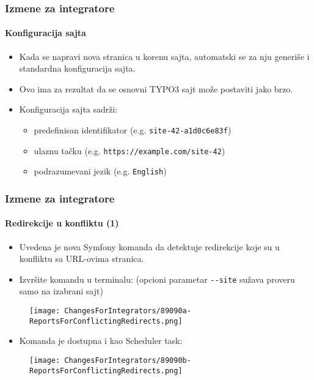 
\begin{frame}[fragile]
	\frametitle{Izmene za integratore}
	\framesubtitle{Konfiguracija sajta}

	\begin{itemize}
		\item Kada se napravi nova stranica u korenu sajta, automatski se za nju generiše i
			standardna konfiguracija sajta.
		\item Ovo ima za rezultat da se osnovni TYPO3 sajt može postaviti jako brzo.
		\item Konfiguracija sajta sadrži:

			\begin{itemize}
				\item predefinisan identifikator (e.g. \texttt{site-42-a1d0c6e83f})
				\item ulaznu tačku (e.g. \texttt{https://example.com/site-42})
				\item podrazumevani jezik (e.g. \texttt{English})
			\end{itemize}

	\end{itemize}

\end{frame}


\begin{frame}[fragile]
	\frametitle{Izmene za integratore}
	\framesubtitle{Redirekcije u konfliktu (1)}

	\begin{itemize}
		\item Uvedena je nova Symfony komanda da detektuje redirekcije koje su u konfliktu
		 	sa URL-ovima stranica.
		\item Izvršite komandu u terminalu:\newline
			\smaller
				(opcioni parametar \texttt{-}\texttt{-site} sužava proveru samo na izabrani sajt)
			\normalsize
	\end{itemize}

	\begin{figure}
		\texttt{[image: ChangesForIntegrators/89090a-ReportsForConflictingRedirects.png]}
	\end{figure}

	\begin{itemize}
		\item Komanda je dostupna i kao Scheduler task:
	\end{itemize}

	\begin{figure}
		\texttt{[image: ChangesForIntegrators/89090b-ReportsForConflictingRedirects.png]}
	\end{figure}

\end{frame}

